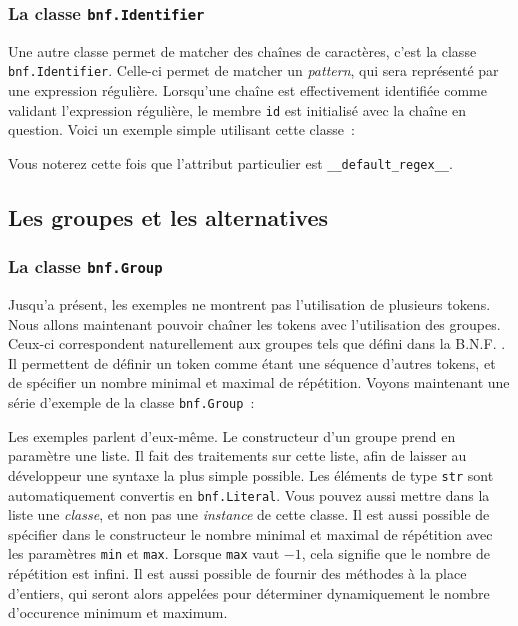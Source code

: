 \documentclass[a4paper]{article}
\newcommand{\fixed}[1]{\texttt{#1}}
\newcommand{\bnf}{B.N.F. }
\begin{document}
            \subsubsection{La classe \fixed{bnf.Identifier}}
                Une autre classe permet de matcher des chaînes de caractères,
                c'est la classe \fixed{bnf.Identifier}. Celle-ci permet de
                matcher un \emph{pattern}, qui sera représenté par une expression
                régulière. Lorsqu'une chaîne est effectivement identifiée comme
                validant l'expression régulière, le membre \fixed{id} est
                initialisé avec la chaîne en question.
                Voici un exemple simple utilisant cette classe~:

                Vous noterez cette fois que l'attribut particulier est
                \fixed{\_\_default\_regex\_\_}.

        \subsection{Les groupes et les alternatives}

            \subsubsection{La classe \fixed{bnf.Group}}
                Jusqu'a présent, les exemples ne montrent pas l'utilisation de
                plusieurs tokens. Nous allons maintenant pouvoir chaîner les
                tokens avec l'utilisation des groupes. Ceux-ci correspondent
                naturellement aux groupes tels que défini dans la \bnf. Il
                permettent de définir un token comme étant une séquence d'autres
                tokens, et de spécifier un nombre minimal et maximal de répétition.
                Voyons maintenant une série d'exemple de la classe \fixed{bnf.Group}~:

                Les exemples parlent d'eux-même. Le constructeur d'un groupe prend
                en paramètre une liste. Il fait des traitements sur cette liste,
                afin de laisser au développeur une syntaxe la plus simple possible.
                Les éléments de type \fixed{str} sont automatiquement convertis en
                \fixed{bnf.Literal}. Vous pouvez aussi mettre dans la liste une
                \emph{classe}, et non pas une \emph{instance} de cette classe.
                Il est aussi possible de spécifier dans le constructeur le
                nombre minimal et maximal de répétition avec les paramètres \fixed{min}
                et \fixed{max}. Lorsque \fixed{max}
                vaut $-1$, cela signifie que le nombre de répétition est infini.
                Il est aussi possible de fournir des méthodes à la place d'entiers,
                qui seront alors appelées pour déterminer dynamiquement le nombre
                d'occurence minimum et maximum.
\end{document}
